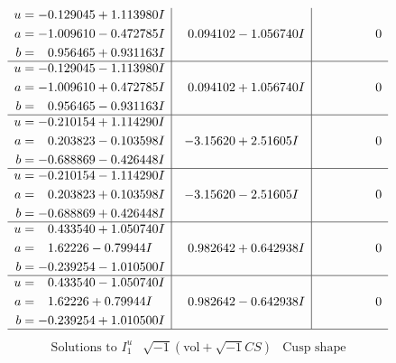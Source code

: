 \documentclass[1p]{elsarticle_modified}
\theoremstyle{definition}
\newcommand{\I}{\sqrt{-1}}
\begin{document}
$$\begin{array}{c|c|c}
\begin{aligned}
u &= -0.129045 + 1.113980 I \\
a &= -1.009610 - 0.472785 I \\
b &= \phantom{-}0.956465 + 0.931163 I\end{aligned}
 & \phantom{-}0.094102 - 1.056740 I & \phantom{-0.000000 } 0 \\ \hline\begin{aligned}
u &= -0.129045 - 1.113980 I \\
a &= -1.009610 + 0.472785 I \\
b &= \phantom{-}0.956465 - 0.931163 I\end{aligned}
 & \phantom{-}0.094102 + 1.056740 I & \phantom{-0.000000 } 0 \\ \hline\begin{aligned}
u &= -0.210154 + 1.114290 I \\
a &= \phantom{-}0.203823 - 0.103598 I \\
b &= -0.688869 - 0.426448 I\end{aligned}
 & -3.15620 + 2.51605 I & \phantom{-0.000000 } 0 \\ \hline\begin{aligned}
u &= -0.210154 - 1.114290 I \\
a &= \phantom{-}0.203823 + 0.103598 I \\
b &= -0.688869 + 0.426448 I\end{aligned}
 & -3.15620 - 2.51605 I & \phantom{-0.000000 } 0 \\ \hline\begin{aligned}
u &= \phantom{-}0.433540 + 1.050740 I \\
a &= \phantom{-}1.62226 - 0.79944 I \\
b &= -0.239254 - 1.010500 I\end{aligned}
 & \phantom{-}0.982642 + 0.642938 I & \phantom{-0.000000 } 0 \\ \hline\begin{aligned}
u &= \phantom{-}0.433540 - 1.050740 I \\
a &= \phantom{-}1.62226 + 0.79944 I \\
b &= -0.239254 + 1.010500 I\end{aligned}
 & \phantom{-}0.982642 - 0.642938 I & \phantom{-0.000000 } 0\\
 \hline 
 \end{array}$$\newpage$$\begin{array}{c|c|c}  
\text{Solutions to }I^u_{1}& \I (\text{vol} + \sqrt{-1}CS) & \text{Cusp shape}\\
 \hline 
\begin{aligned}

\end{aligned}
\end{array}$$
\end{document}
